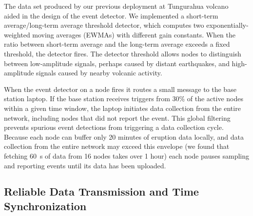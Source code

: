 \vfill\eject

The data set produced by our previous deployment at Tungurahua
volcano~\cite{volcano-ewsn05} aided in the design of the event detector. We
implemented a short-term average/long-term average threshold detector, which
computes two exponentially-weighted moving averages (EWMAs) with different
gain constants. When the ratio between short-term average and the long-term
average exceeds a fixed threshold, the detector fires. The detector threshold
allows nodes to distinguish between low-amplitude signals, perhaps caused by
distant earthquakes, and high-amplitude signals caused by nearby volcanic
activity.

When the event detector on a node fires it routes a small message to the base
station laptop. If the base station receives triggers from 30\% of the active
nodes within a given time window, the laptop initiates data collection from
the entire network, including nodes that did not report the event. This
global filtering prevents spurious event detections from triggering a data
collection cycle. Because each node can buffer only 20 minutes of eruption
data locally, and data collection from the entire network may exceed this
envelope (we found that fetching 60~s of data from 16 nodes takes over 1
hour) each node pauses sampling and reporting events until its data has been
uploaded.

\subsection{Reliable Data Transmission and Time Synchronization}
\label{evaluation-subsec-fetch}

